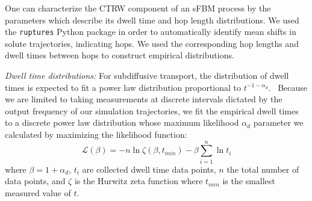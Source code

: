 \documentclass{article}
\begin{document}

  
  One can characterize the CTRW component of an sFBM process by the parameters which describe
  its dwell time and hop length distributions. We used the \texttt{ruptures} Python
  package in order to automatically identify mean shifts in solute trajectories, 
  indicating hops.\cite{truong_ruptures:_2018} We used the corresponding hop lengths
  and dwell times between hops to construct empirical distributions.
  
  \textit{Dwell time distributions:} For subdiffusive transport, the distribution 
  of dwell times is expected to fit a power law distribution 
  proportional to $t^{-1-\alpha_d}$.~\cite{meroz_toolbox_2015}
  Because we are limited to taking measurements at discrete intervals dictated by the output 
  frequency of our simulation trajectories, we fit the empirical dwell times
  to a discrete power law distribution whose maximum likelihood $\alpha_d$ 
  parameter we calculated by maximizing the likelihood function: 
  \begin{equation}
	\mathcal{L}(\beta) = -n\ln \zeta(\beta, t_{min}) -
	\beta\sum_{i=1}^{n} \ln t_i 
  \label{eqn:powerlaw_likelihood}
  \end{equation}
  where $\beta = 1 + \alpha_d$, $t_i$ are collected dwell time data points,
  $n$ the total number of data points, and $\zeta$ is the Hurwitz zeta function
  where $t_{min}$ is the smallest measured value of	$t$.~\cite{clauset_power-law_2009}
  
\end{document}
